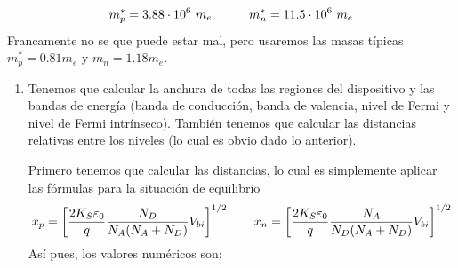\begin{equation}
    m_p^* = 3.88 \cdot 10^6 \ m_e \quad \quad \quad m_n^* = 11.5 \cdot 10^6 \ m_e
\end{equation}
Francamente no se que puede estar mal, pero usaremos las masas típicas $m_p^* = 0.81m_e$ y $m_n=1.18 m_e$. 
\begin{enumerate}[label=\alph*)]
    \item Tenemos que calcular la anchura de todas las regiones del dispositivo y las bandas de energía (banda de conducción, banda de valencia, nivel de Fermi y nivel de Fermi intrínseco). También tenemos que calcular las distancias relativas entre los niveles (lo cual es obvio dado lo anterior). 
    
    Primero tenemos que calcular las distancias, lo cual es simplemente aplicar las fórmulas para la situación de equilibrio
    \begin{equation}
        x_p = \left[ \frac{2K_S\varepsilon_0}{q} \frac{N_D}{N_A(N_A+N_D)}  V_{bi} \right]^{1/2}  \qquad 
        x_n = \left[ \frac{2K_S\varepsilon_0}{q} \frac{N_A}{N_D(N_A+N_D)}  V_{bi} \right]^{1/2}
    \end{equation}
    Así pues, los valores numéricos son: 


\end{enumerate}
